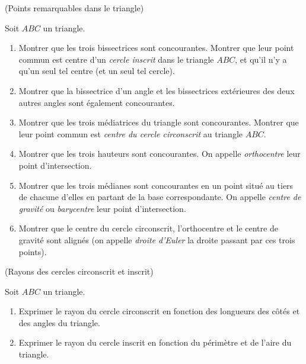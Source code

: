 \documentclass[a4paper,11pt,reqno]{amsart}
\begin{document}
\begin{exo} (Points remarquables dans le triangle)

  Soit $ABC$ un triangle.
  \begin{enumerate}
    \item Montrer que les trois bissectrices sont concourantes. Montrer que leur point commun est centre d'un \emph{cercle inscrit} dans le triangle $ABC$, et qu'il n'y a qu'un seul tel centre (et un seul tel cercle).
    \item Montrer que la bissectrice d'un angle et les bissectrices extérieures des deux autres angles sont également concourantes.
    \item Montrer que les trois médiatrices du triangle sont concourantes. Montrer que leur point commun est \emph{centre du cercle circonscrit} au triangle $ABC$.
    \item Montrer que les trois hauteurs sont concourantes. On appelle \emph{orthocentre} leur point d'intersection.
    \item Montrer que les trois médianes sont concourantes en un point situé au tiers de chacune d'elles en partant de la base correspondante. On appelle \emph{centre de gravité} ou \emph{barycentre} leur point d'intersection.
    \item Montrer que le centre du cercle circonscrit, l'orthocentre et le centre de gravité sont alignés (on appelle \emph{droite d'Euler} la droite passant par ces trois points). %
  \end{enumerate}
\end{exo}

\begin{exo} (Rayons des cercles circonscrit et inscrit)

  Soit $ABC$ un triangle.
  \begin{enumerate}
    \item Exprimer le rayon du cercle circonscrit en fonction des longueurs des côtés et des angles du triangle.
    \item Exprimer le rayon du cercle inscrit en fonction du périmètre et de l'aire du triangle.
  \end{enumerate}
\end{exo}
\end{document}

